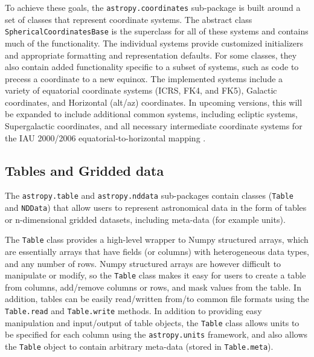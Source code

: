 \documentclass[traditabstract]{aa}
\begin{document}
To achieve these goals, the \texttt{astropy.coordinates} sub-package
is built around a set of classes that represent coordinate systems.
The abstract class \texttt{SphericalCoordinatesBase} is the superclass
for all of these systems and contains much of the functionality.  The
individual systems provide customized initializers and appropriate
formatting and representation defaults.  For some classes, they also
contain added functionality specific to a subset of systems, such as
code to precess a coordinate to a new equinox.  The implemented
systems include a variety of equatorial coordinate systems (ICRS, FK4,
and FK5), Galactic coordinates, and Horizontal (alt/az) coordinates.
In upcoming versions, this will be expanded to include additional
common systems, including ecliptic systems, Supergalactic coordinates,
and all necessary intermediate coordinate systems for the IAU
2000/2006 equatorial-to-horizontal mapping \citep[e.g.,][]{soffel03,
  usnocircular179}.


\subsection{Tables and Gridded data}


\label{sec:table}

The \texttt{astropy.table} and \texttt{astropy.nddata} sub-packages contain
classes (\texttt{Table} and \texttt{NDData}) that allow users to represent
astronomical data in the form of tables or n-dimensional gridded datasets,
including meta-data (for example units).

The \texttt{Table} class provides a high-level wrapper to Numpy structured
arrays, which are essentially arrays that have fields (or columns) with
heterogeneous data types, and any number of rows. Numpy structured arrays are
however difficult to manipulate or modify, so the \texttt{Table} class makes
it easy for users to create a table from columns, add/remove columns or rows,
and mask values from the table. In addition, tables can be easily
read/written from/to common file formats using the \texttt{Table.read} and
\texttt{Table.write} methods. In addition to providing easy manipulation and
input/output of table objects, the \texttt{Table} class allows units to be
specified for each column using the \texttt{astropy.units} framework, and
also allows the \texttt{Table} object to contain arbitrary meta-data (stored
in \texttt{Table.meta}).
\end{document}
